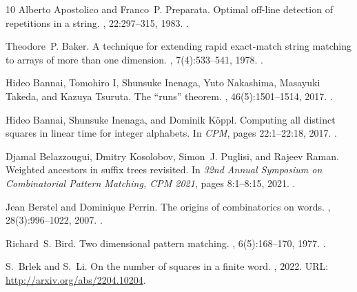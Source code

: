 \documentclass[11pt,letterpaper]{article}
\begin{document}
\begin{thebibliography}{10}
Alberto Apostolico and Franco~P. Preparata.
\newblock Optimal off-line detection of repetitions in a string.
, 22:297--315, 1983.
\newblock \href {https://doi.org/10.1016/0304-3975(83)90109-3}
  {}.

Theodore~P. Baker.
\newblock A technique for extending rapid exact-match string matching to arrays
  of more than one dimension.
, 7(4):533--541, 1978.
\newblock \href {https://doi.org/10.1137/0207043} {}.

Hideo Bannai, Tomohiro I, Shunsuke Inenaga, Yuto Nakashima, Masayuki Takeda,
  and Kazuya Tsuruta.
\newblock The ``runs'' theorem.
, 46(5):1501--1514, 2017.
\newblock \href {https://doi.org/10.1137/15M1011032}
  {}.

Hideo Bannai, Shunsuke Inenaga, and Dominik K{\"{o}}ppl.
\newblock Computing all distinct squares in linear time for integer alphabets.
\newblock In {\em {CPM}}, pages 22:1--22:18, 2017.
\newblock \href {https://doi.org/10.4230/LIPICS.CPM.2017.22}
  {}.

Djamal Belazzougui, Dmitry Kosolobov, Simon~J. Puglisi, and Rajeev Raman.
\newblock Weighted ancestors in suffix trees revisited.
\newblock In {\em 32nd Annual Symposium on Combinatorial Pattern Matching,
  {CPM} 2021}, pages 8:1--8:15, 2021.
\newblock \href {https://doi.org/10.4230/LIPICS.CPM.2021.8}
  {}.

Jean Berstel and Dominique Perrin.
\newblock The origins of combinatorics on words.
, 28(3):996--1022, 2007.
\newblock \href {https://doi.org/10.1016/J.EJC.2005.07.019}
  {}.

Richard~S. Bird.
\newblock Two dimensional pattern matching.
, 6(5):168--170, 1977.
\newblock \href {https://doi.org/10.1016/0020-0190(77)90017-5}
  {}.

S.~Brlek and S.~Li.
\newblock On the number of squares in a finite word.
, 2022.
\newblock URL: \url{http://arxiv.org/abs/2204.10204}.


\end{thebibliography}
\end{document}

